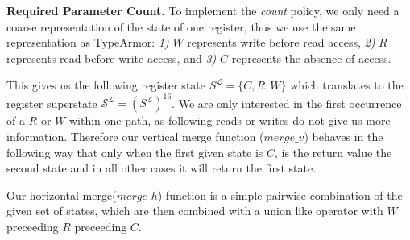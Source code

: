 \textbf{Required Parameter Count.}
\label{subsection:requiredparamcount}
To implement the \emph{count} policy, we only need a coarse representation of the state of one register, thus we use the same representation as TypeArmor:
\textit{1)} $W$ represents write before read access,
\textit{2)} $R$ represents read before write access, and
\textit{3)} $C$ represents the absence of access.

This gives us the following register state $S^\mathcal{L} = \{ C, R, W \}$ which translates to the register superstate $\mathcal{S}^\mathcal{L} = (S^\mathcal{L})^{16}$.
We are only interested in the first occurrence of a $R$ or $W$ within one path, as following reads or writes do not give us more information. 
Therefore our vertical merge function ($merge\_v$) behaves in the following way that only when the first given state is $C$, 
is the return value the second state and in all other cases it will return the first state.


Our horizontal merge($merge\_h$) function is a simple pairwise combination of the given set of states, 
which are then combined with a union like operator with $W$ preceeding $R$ preceeding $C$.

%


